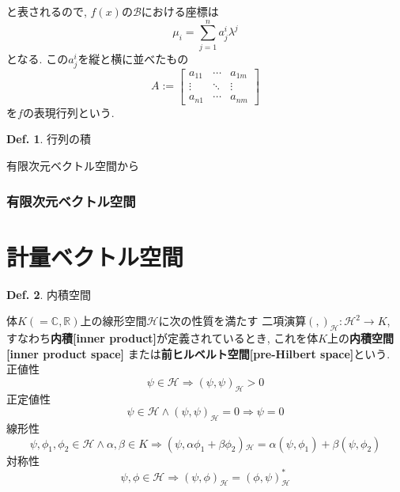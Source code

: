 \documentclass[a4paper,10pt,report]{amsart}
\theoremstyle{plain}
\theoremstyle{definition}
\newtheorem{defn}{Def.}[section]
\theoremstyle{remark}
\begin{document}
と表されるので, \(f(x)\)の\(\mathcal{B}\)における座標は
\begin{equation}
    \mu_{i}=\sum_{j=1}^{n}a_{j}^{i}\lambda^{j}
\end{equation}
となる. 
この\(a^{i}_{j}\)を縦と横に並べたもの
\begin{equation}
    A:=
    \begin{bmatrix}
    a_{11} & \cdots & a_{1m} \\ 
    \vdots & \ddots & \vdots \\ 
    a_{n1} & \cdots & a_{nm}
    \end{bmatrix}
\end{equation}
を\(f\)の表現行列という.
\begin{leftbar}
    \begin{defn}行列の積\par
        有限次元ベクトル空間から
    \end{defn}
\end{leftbar}
\section{有限次元ベクトル空間}
\part{計量ベクトル空間}
\begin{leftbar}
    \begin{defn}内積空間\par
        体\(K(=\mathbb{C},\mathbb{R})\)上の線形空間\(\mathcal{H}\)に次の性質を満たす
        二項演算\({(,)}_{\mathcal{H}}:\mathcal{H}^{2}\to K\), 
        すなわち\textbf{内積[inner product]}が定義されているとき, 
        これを体\(K\)上の\textbf{内積空間[inner product space]}
        または\textbf{前ヒルベルト空間[pre-Hilbert space]}という. \\
        正値性
        \begin{equation}
           \psi\in\mathcal{H}\Rightarrow {(\psi,\psi)}_{\mathcal{H}}>0
        \end{equation}
        正定値性
        \begin{equation}
            \psi\in\mathcal{H}\wedge{(\psi,\psi)}_{\mathcal{H}}=0\Rightarrow\psi=0
        \end{equation}
        線形性
        \begin{equation}
            \psi,\phi_{1},\phi_{2}\in\mathcal{H}\wedge\alpha,\beta\in K\Rightarrow(\psi,\alpha\phi_{1}+\beta\phi_{2}){}_{\mathcal{H}}
            =\alpha(\psi,\phi_{1})+\beta(\psi,\phi_{2})
        \end{equation}
        対称性
        \begin{equation}
            \psi,\phi\in\mathcal{H}\Rightarrow{(\psi,\phi)}_{\mathcal{H}}={(\phi,\psi)}_{\mathcal{H}}^{*}
        \end{equation}
    \end{defn}
\end{leftbar}
\end{document}

